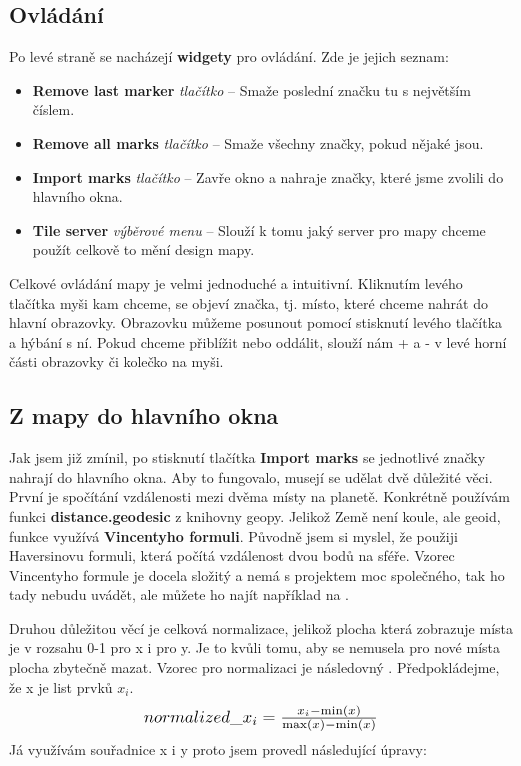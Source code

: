 \subsection{Ovládání}
Po levé straně se nacházejí \textbf{widgety} pro ovládání. Zde je jejich seznam:
\begin{itemize}
    \item \textbf{Remove last marker} \textit{tlačítko} -- Smaže poslední značku tu s největším číslem. 
    \item \textbf{Remove all marks} \textit{tlačítko} -- Smaže všechny značky, pokud nějaké jsou. 
    \item \textbf{Import marks} \textit{tlačítko} -- Zavře okno a nahraje značky, které jsme zvolili do hlavního okna.
    \item \textbf{Tile server} \textit{výběrové menu} -- Slouží k tomu jaký server pro mapy chceme použít celkově to mění design mapy. 
\end{itemize}
Celkové ovládání mapy je velmi jednoduché a intuitivní. Kliknutím levého tlačítka myši kam chceme, se objeví značka, tj. místo, které chceme nahrát do hlavní obrazovky. Obrazovku můžeme posunout pomocí stisknutí levého tlačítka a hýbání s ní. Pokud chceme přiblížit nebo oddálit, slouží nám + a - v levé horní části obrazovky či kolečko na myši.

\subsection{Z mapy do hlavního okna}

Jak jsem již zmínil, po stisknutí tlačítka \textbf{Import marks} se jednotlivé značky nahrají do hlavního okna. Aby to fungovalo, musejí se udělat dvě důležité věci. První je spočítání vzdálenosti mezi dvěma místy na planetě. Konkrétně používám funkci \textbf{distance.geodesic} z knihovny geopy\cite{GeopyDistance}. Jelikož Země není koule, ale geoid, funkce využívá \textbf{Vincentyho formuli}. Původně jsem si myslel, že použiji Haversinovu formuli, která počítá vzdálenost dvou bodů na sféře. Vzorec Vincentyho formule je docela složitý a nemá s projektem moc společného, tak ho tady nebudu uvádět, ale můžete ho najít například na \cite{VincentyFormulae}.

Druhou důležitou věcí je celková normalizace, jelikož plocha která zobrazuje místa je v rozsahu 0-1 pro x i pro y. Je to kvůli tomu, aby se nemusela pro nové místa plocha zbytečně mazat. Vzorec pro normalizaci je následovný \cite{SENormalizationAns}. Předpokládejme, že x je list prvků $x_i$.
\begin{equation*}
    \scalebox{1.2}{$normalized\_x_i=\frac{x_i-\min (x)}{\max (x)-\min (x)}$}
\end{equation*}
Já využívám souřadnice x i y proto jsem provedl následující úpravy:

